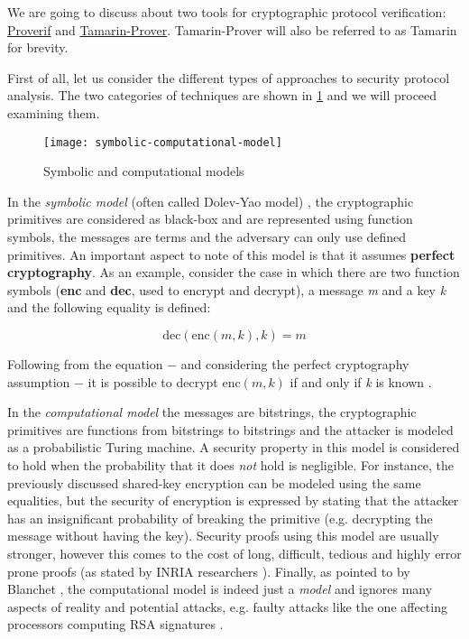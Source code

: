 
We are going to discuss about two tools for cryptographic protocol verification: \href{https://prosecco.gforge.inria.fr/personal/bblanche/proverif/}{Proverif} and \href{https://tamarin-prover.github.io/}{Tamarin-Prover}. Tamarin-Prover will also be referred to as Tamarin for brevity.

First of all, let us consider the different types of approaches to security protocol analysis. The two categories of techniques are shown in \cref{fig:symbolic-computational-model} and we will proceed examining them.

\begin{figure}[t]
    \texttt{[image: symbolic-computational-model]}
    \centering
    \caption{Symbolic and computational models}
    \label{fig:symbolic-computational-model}
\end{figure}

In the \textit{symbolic model} (often called Dolev-Yao model) \cite{Dolev-Yao}, the cryptographic primitives are considered as black-box and are represented using function symbols, the messages are terms and the adversary can only use defined primitives. An important aspect to note of this model is that it assumes \textbf{perfect cryptography}. As an example, consider the case in which there are two function symbols (\textbf{enc} and \textbf{dec}, used to encrypt and decrypt), a message \textit{m} and a key \textit{k} and the following equality is defined:

\begin{equation}
\mbox{dec}\left(\mbox{enc}\left(m, k\right), k\right) = m
\end{equation}

Following from the equation $-$ and considering the perfect cryptography assumption $-$ it is possible to decrypt $\mbox{enc}\left(m, k\right)$ if and only if \textit{k} is known \cite{SymbolicComputationalBlanchet}.

In the \textit{computational model} the messages are bitstrings, the cryptographic primitives are functions from bitstrings to bitstrings and the attacker is modeled as a probabilistic Turing machine.
A security property in this model is considered to hold when the probability that it does \textit{not} hold is negligible. For instance, the previously discussed shared-key encryption can be modeled using the same equalities, but the security of encryption is expressed by stating that the attacker has an insignificant probability of breaking the primitive (e.g. decrypting the message without having the key). Security proofs using this model are usually stronger, however this comes to the cost of long, difficult, tedious and highly error prone proofs (as stated by INRIA researchers \cite{ComputationalAnalysisCryptoSystemsINRIA}). Finally, as pointed to by Blanchet \cite{SymbolicComputationalBlanchet}, the computational model is indeed just a \textit{model} and ignores many aspects of reality and potential attacks, e.g. faulty attacks like the one affecting processors computing RSA signatures \cite{RSAFaultAttack}. 

